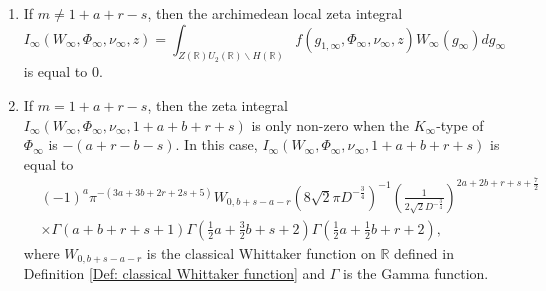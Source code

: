 \documentclass[10pt,a4paper]{amsart}
\def\RR{\mathbb{R}}
\begin{document}
\begin{proposition}
\label{Prop:Arch_Zeta}
        \begin{enumerate}
            \item If $m \neq 1 + a + r - s$,  then the archimedean local zeta integral 
                    \begin{equation*}
                        I_{\infty}(W_{\infty}, \Phi_{\infty}, \nu_{\infty}, z) = \int_{Z(\RR)U_{2}(\RR) \backslash H(\RR)} f(g_{1, \infty}, \Phi_{\infty}, \nu_{\infty}, z) W_{\infty}(g_{\infty}) dg_{\infty}
                    \end{equation*} is equal to $0$. 
            \item If $m = 1 + a + r - s$, then the zeta integral $I_{\infty}(W_{\infty}, \Phi_{\infty}, \nu_{\infty}, 1 + a + b + r + s)$ is only non-zero when the $K_{\infty}$-type of $\Phi_{\infty}$ is $-(a + r -b - s)$.  In this case,  $I_{\infty}(W_{\infty}, \Phi_{\infty}, \nu_{\infty}, 1 + a + b + r + s)$ is equal to
            \begin{align*}
                &  (-1)^{a} \pi^{-(3a + 3b + 2r + 2s + 5)} W_{0, b + s - a - r}(8\sqrt{2}\pi D^{-\frac{3}{4}})^{-1}\left(\frac{1}{2\sqrt{2}D^{-\frac{3}{4}}}\right)^{2a + 2b + r + s + \frac{7}{2}} \\
                & \times \Gamma(a + b + r + s + 1) \Gamma\left( \frac{1}{2}a + \frac{3}{2}b + s + 2\right) \Gamma\left(\frac{1}{2}a + \frac{1}{2} b + r + 2\right), 
            \end{align*}
            where $W_{0,b + s - a - r}$ is the classical Whittaker function on $\RR$ defined in Definition \ref{Def: classical Whittaker function} and $\Gamma$ is the Gamma function. 
        \end{enumerate}
\end{proposition}
\end{document}
